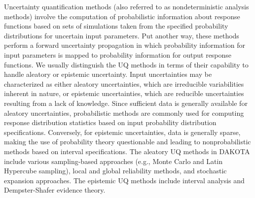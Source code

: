 Uncertainty quantification methods (also referred to as
nondeterministic analysis methods) involve the computation of
probabilistic information about response functions based on sets of
simulations taken from the specified probability distributions for
uncertain input parameters. Put another way, these methods perform a
forward uncertainty propagation in which probability information for
input parameters is mapped to probability information for output
response functions. We usually distinguish the UQ methods in terms of 
their capability to handle aleatory or epistemic uncertainty. 
Input uncertainties may be characterized as either aleatory
uncertainties, which are irreducible variabilities inherent in nature,
or epistemic uncertainties, which are reducible uncertainties
resulting from a lack of knowledge.  Since sufficient data is
generally available for aleatory uncertainties, probabilistic methods
are commonly used for computing response distribution statistics based
on input probability distribution specifications.  Conversely, for
epistemic uncertainties, data is generally sparse, making the use of
probability theory questionable and leading to nonprobabilistic
methods based on interval specifications.
The aleatory UQ methods in DAKOTA include various
sampling-based approaches (e.g., Monte Carlo and Latin Hypercube
sampling), local and global reliability methods, and stochastic expansion
approaches.  The epistemic UQ methods include interval 
analysis and Dempster-Shafer evidence theory.

